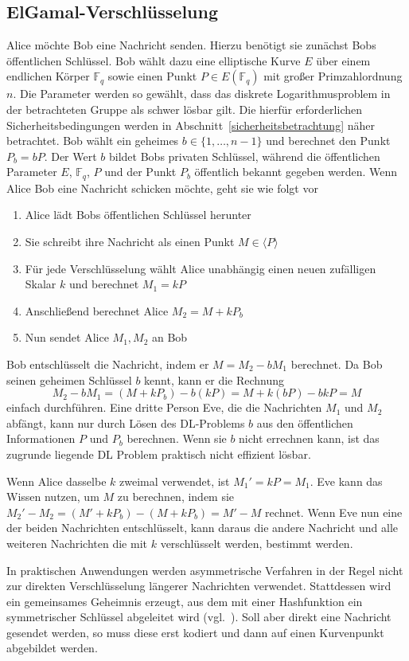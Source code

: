 \subsection{ElGamal-Verschlüsselung}
Alice möchte Bob eine Nachricht senden. Hierzu benötigt sie zunächst
Bobs öffentlichen Schlüssel. Bob wählt dazu eine elliptische Kurve $E$ über einem endlichen Körper $\mathbb{F}_q$ sowie einen Punkt $P\in E(\mathbb F_q)$ mit großer Primzahlordnung $n$. Die Parameter werden so gewählt, dass das diskrete Logarithmusproblem in der betrachteten Gruppe als schwer lösbar gilt. Die hierfür erforderlichen Sicherheitsbedingungen werden in Abschnitt~\ref{sicherheitsbetrachtung} näher betrachtet. Bob wählt ein geheimes $b\in\{1,\dots,n-1\}$ und berechnet den Punkt $P_b=bP$. Der Wert $b$ bildet Bobs privaten Schlüssel, während die öffentlichen Parameter $E$, $\mathbb F_q$, $P$ und der Punkt $P_b$ öffentlich bekannt gegeben werden. Wenn Alice Bob eine Nachricht schicken möchte, geht sie wie folgt vor
\begin{enumerate}
    \item Alice lädt Bobs öffentlichen Schlüssel herunter
    \item Sie schreibt ihre Nachricht als einen Punkt $M\in \langle P\rangle$
    \item Für jede Verschlüsselung wählt Alice unabhängig einen neuen zufälligen Skalar $k$ und berechnet $M_1=kP$
    \item Anschließend berechnet Alice $M_2=M+kP_b$
    \item Nun sendet Alice $M_1,M_2$ an Bob
\end{enumerate}
Bob entschlüsselt die Nachricht, indem er \(M=M_2-bM_1\) berechnet. Da Bob seinen geheimen Schlüssel $b$ kennt, kann er die Rechnung
\[
    M_2-bM_1=(M+kP_b)-b(kP)= M+k(bP)-bkP=M
\]
einfach durchführen. Eine dritte Person Eve, die die Nachrichten $M_1$ und $M_2$ abfängt, kann nur durch Lösen des DL-Problems $b$ aus den öffentlichen Informationen $P$ und $P_b$ berechnen. Wenn sie $b$ nicht errechnen kann, ist das zugrunde liegende DL Problem praktisch nicht effizient lösbar.

Wenn Alice dasselbe $k$ zweimal verwendet, ist $M_1'=kP=M_1$. Eve kann das Wissen nutzen, um $M$ zu berechnen, indem sie $M_2'-M_2= (M'+kP_b)-(M+kP_b)=M'-M$ rechnet. Wenn Eve nun eine der beiden Nachrichten entschlüsselt, kann daraus die andere Nachricht und alle weiteren Nachrichten die mit $k$ verschlüsselt werden, bestimmt werden.
\begin{bemerkung}
    In praktischen Anwendungen werden asymmetrische Verfahren in der Regel nicht zur direkten Verschlüsselung längerer Nachrichten verwendet. Stattdessen wird ein gemeinsames Geheimnis erzeugt, aus dem mit einer Hashfunktion ein symmetrischer Schlüssel abgeleitet wird (vgl.~\cite[S.~291]{guneysu24}). Soll aber direkt eine Nachricht gesendet werden, so muss diese erst kodiert und dann auf einen Kurvenpunkt abgebildet werden.
\end{bemerkung}

